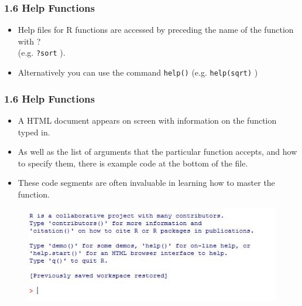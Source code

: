 \documentclass{beamer}
\begin{document}
 	\begin{frame}
 		
 		\frametitle{1.6 Help Functions}
 		\begin{itemize}
 			\item  Help files for R functions are accessed by preceding the name of the function with ?\\  (e.g. \texttt{?sort}
 			). 
 			
 			\item Alternatively you can use the command \texttt{help()} (e.g. \texttt{help(sqrt)} )
 		\end{itemize}
 		
 	\end{frame}
 	\begin{frame}
 		
 		\frametitle{1.6 Help Functions}
 		\begin{itemize}
 			\item A HTML document appears on screen with information on the function typed in. 
 			\item As well
 			as the list of arguments that the particular function accepts, and how to specify them, there is
 			example code at the bottom of the file. 
 			\item These code segments are often invaluable in learning
 			how to master the function.
 		\end{itemize}
 		
 		
 	\end{frame}
 	
 	\begin{frame}
 		\begin{figure}
 			\centering
 			\includegraphics[width=1.2\linewidth]{images/Rhelpcommands}
 		\end{figure}
 	\end{frame}   
 	
\end{document}
